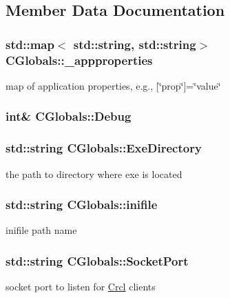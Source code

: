 \subsection{Member Data Documentation}
\hypertarget{classCGlobals_a66ffe804a7f6a8d41803482f5dc121e6}{
\subsubsection[{\-\_\-appproperties}]{\setlength{\rightskip}{0pt plus 5cm}std\-::map$<$ std\-::string, std\-::string$>$ C\-Globals\-::\-\_\-appproperties}}\label{classCGlobals_a66ffe804a7f6a8d41803482f5dc121e6}
map of application properties, e.\-g., \mbox{[}\char`\"{}prop\char`\"{}\mbox{]}=\char`\"{}value\char`\"{} \hypertarget{classCGlobals_ac0446ab6c8959e553bd9e2cae4e3f5f3}{
\subsubsection[{Debug}]{\setlength{\rightskip}{0pt plus 5cm}int\& C\-Globals\-::\-Debug}}\label{classCGlobals_ac0446ab6c8959e553bd9e2cae4e3f5f3}
\hypertarget{classCGlobals_a366c33d78a09a99d5eb0e902facf4624}{
\subsubsection[{Exe\-Directory}]{\setlength{\rightskip}{0pt plus 5cm}std\-::string C\-Globals\-::\-Exe\-Directory}}\label{classCGlobals_a366c33d78a09a99d5eb0e902facf4624}
the path to directory where exe is located \hypertarget{classCGlobals_a5ded9605f21a03f651f6097f1b0ef42c}{
\subsubsection[{inifile}]{\setlength{\rightskip}{0pt plus 5cm}std\-::string C\-Globals\-::inifile}}\label{classCGlobals_a5ded9605f21a03f651f6097f1b0ef42c}
inifile path name \hypertarget{classCGlobals_ac1198be99fab95dbe1f2b94891fb0088}{
\subsubsection[{Socket\-Port}]{\setlength{\rightskip}{0pt plus 5cm}std\-::string C\-Globals\-::\-Socket\-Port}}\label{classCGlobals_ac1198be99fab95dbe1f2b94891fb0088}
socket port to listen for \hyperlink{namespaceCrcl}{Crcl} clients 

